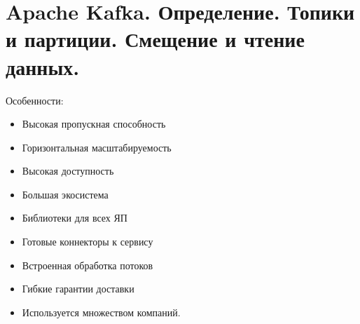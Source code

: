 \section{Apache Kafka. Определение. Топики и партиции. Смещение и чтение данных.}


Особенности:
\begin{itemize}
    \item Высокая пропускная способность
    \item Горизонтальная масштабируемость
    \item Высокая доступность
    \item Большая экосистема
    \item Библиотеки для всех ЯП
    \item Готовые коннекторы к сервису
    \item Встроенная обработка потоков
    \item Гибкие гарантии доставки
    \item Используется множеством компаний.
\end{itemize}


